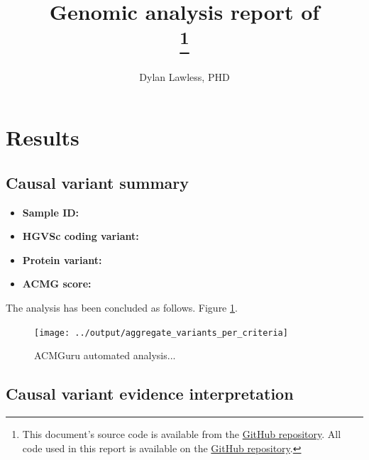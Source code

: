 \documentclass{article}
\begin{document}
\title{\Large \bf Genomic analysis report of\\
{\color{kispired}\SampleID}
\footnote{This document's source code is available from the 
\href{https://github.com/DylanLawless/kit_assess/blob/master/latex/report.tex}{GitHub repository}.
All code used in this report is available on the 
\href{https://github.com/DylanLawless/kit_assess}{GitHub repository}.}
}
\author[1]{\rm Dylan Lawless, PHD}

\maketitle
\color{kispiblue}
\section{Results}

\subsection{Causal variant summary}
\begin{itemize}
\item \textbf{Sample ID:} {\color{kispired}\SampleID}
\item \textbf{HGVSc coding variant:} {\color{kispired}\CodingVariant}
\item \textbf{Protein variant:} {\color{kispired}\ProteinVariant}
\item \textbf{ACMG score:} {\color{kispired}\ACMGScore}
\end{itemize}
The analysis has been concluded as follows.
{\color{kispired} Figure} \ref{fig:acmguru_p1}.

\begin{figure}[h] \hspace*{0cm} 
\begin{center}
    \texttt{[image: ../output/aggregate\_variants\_per\_criteria]}
	\caption{ACMGuru automated analysis...}
	\label{fig:acmguru_p1}
\end{center}
\end{figure}


\subsection{Causal variant evidence interpretation}
\end{document}

